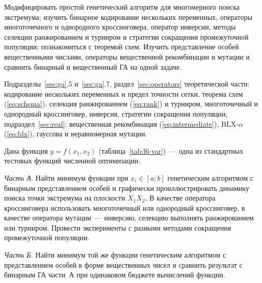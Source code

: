 
Модифицировать простой генетический алгоритм для многомерного поиска экстремума; изучить бинарное
кодирование нескольких переменных, операторы многоточечного и однородного кроссинговера, оператор
инверсии, методы селекции ранжированием и турниром и стратегии сокращения промежуточной популяции;
познакомиться с теоремой схем. Изучить представление особей вещественными числами, операторы
вещественной рекомбинации и мутации и сравнить бинарный и вещественный ГА на одной задаче.

Подразделы~\ref{sec:ga}.5 и~\ref{sec:ga}.7, раздел~\ref{sec:operators} теоретической части: кодирование
нескольких переменных и предел точности сетки, теорема схем (\ref{eq:schema}), селекция ранжированием
(\ref{eq:rank}) и турниром, многоточечный и однородный кроссинговер, инверсия, стратегии сокращения
популяции; подраздел~\ref{sec:real}: вещественная рекомбинация (\ref{eq:intermediate}),
BLX-$\alpha$ (\ref{eq:blx}), гауссова и неравномерная мутации.

Дана функция $y = f(x_1, x_2)$ (таблица~\ref{tab:l6-var})~--- одна из стандартных тестовых функций
численной оптимизации.

\emph{Часть А.} Найти минимум функции при $x_i \in [a; b]$ генетическим алгоритмом с бинарным
представлением особей и графически проиллюстрировать динамику поиска точки экстремума на плоскости
$X_1 X_2$. В качестве оператора кроссинговера использовать многоточечный или однородный кроссинговер,
в качестве оператора мутации~--- инверсию, селекцию выполнять ранжированием или турниром. Провести
эксперименты с разными методами сокращения промежуточной популяции.

\emph{Часть Б.} Найти минимум той же функции генетическим алгоритмом с представлением особей в форме
вещественных чисел и сравнить результат с бинарным ГА части~А при одинаковом бюджете вычислений функции.


